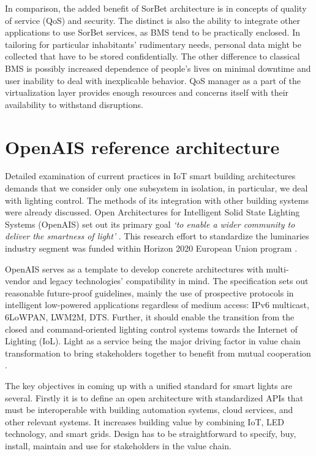 \documentclass[11pt, english, a4paper, twoside]{article}
\begin{document}
In comparison, the added benefit of SorBet architecture is in concepts of quality of service (QoS) and security. The distinct is also the ability to integrate other applications to use SorBet services, as BMS tend to be practically enclosed. In tailoring for particular inhabitants' rudimentary needs, personal data might be collected that have to be stored confidentially. The other difference to classical BMS is possibly increased dependence of people's lives on minimal downtime and user inability to deal with inexplicable behavior. QoS manager as a part of the virtualization layer provides enough resources and concerns itself with their availability to withstand disruptions.

\section{OpenAIS reference architecture} \label{openais}
Detailed examination of current practices in IoT smart building architectures demands that we consider only one subsystem in isolation, in particular, we deal with lighting control. The methods of its integration with other building systems were already discussed. Open Architectures for Intelligent Solid State Lighting Systems (OpenAIS) set out its primary goal \emph{`to enable a wider community to deliver the smartness of light'} \cite{openais}. This research effort to standardize the luminaries industry segment was funded within Horizon 2020 European Union program \cite{horizon2020}.

OpenAIS serves as a template to develop concrete architectures with multi-vendor and legacy technologies' compatibility in mind. The specification sets out reasonable future-proof guidelines, mainly the use of prospective protocols in intelligent low-powered applications regardless of medium access: IPv6 multicast, 6LoWPAN, LWM2M, DTS. Further, it should enable the transition from the closed and command-oriented lighting control systems towards the Internet of Lighting (IoL). Light as a service being the major driving factor in value chain transformation to bring stakeholders together to benefit from mutual cooperation \cite{iol}. 

The key objectives in coming up with a unified standard for smart lights are several. Firstly it is to define an open architecture with standardized APIs that must be interoperable with building automation systems, cloud services, and other relevant systems. It increases building value by combining IoT, LED technology, and smart grids. Design has to be straightforward to specify, buy, install, maintain and use for stakeholders in the value chain.
\end{document}
